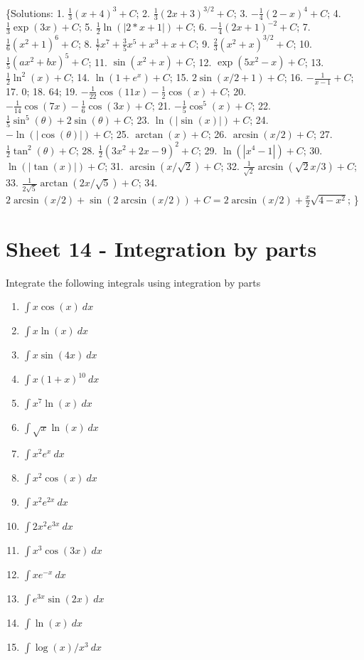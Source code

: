 \documentclass[
  11pt,
  oneside]{book}
\providecommand{\tightlist}{%
  \setlength{\itemsep}{0pt}\setlength{\parskip}{0pt}}
\newcommand{\slide}{}
\theoremstyle{definition}
\theoremstyle{definition}
\theoremstyle{definition}
\theoremstyle{definition}
\theoremstyle{remark}
\begin{document}
\{Solutions:
1. \(\frac{1}{3}(x+4)^3+C\);
2. \(\frac{1}{3}(2x+3)^{3/2}+C\);
3. \(-\frac{1}{4}(2-x)^4 +C\);
4. \(\frac{1}{3}\exp(3x)+C\);
5. \(\frac{1}{2}\ln(|2*x+1|)+C\);
6. \(-\frac{1}{4}(2x+1)^{-2}+C\);
7. \(\frac{1}{6}(x^2+1)^6+C\);
8. \(\frac{1}{7}x^7+\frac{3}{5}x^5+x^3+x+C\);
9. \(\frac{2}{3}(x^2+x)^{3/2}+C\);
10. \(\frac{1}{5}(ax^2+bx)^{5}+C\);
11. \(\sin(x^2+x)+C\);
12. \(\exp(5x^2-x)+C\);
13. \(\frac{1}{2}\ln^2(x)+C\);
14. \(\ln(1+e^x)+C\);
15. \(2\sin(x/2+1)+C\);
16. \(-\frac{1}{x-1}+C\);
17. \(0\);
18. \(64\);
19. \(-\frac{1}{22}\cos(11x)-\frac{1}{2}\cos(x)+C\);
20. \(-\frac{1}{14}\cos(7x)-\frac{1}{6}\cos(3x)+C\);
21. \(-\frac{1}{5}\cos^5(x)+C\);
22. \(\frac{1}{5}\sin^5(\theta)+2\sin(\theta)+C\);
23. \(\ln(|\sin(x)|)+C\);
24. \(-\ln(|\cos(\theta)|)+C\);
25. \(\arctan(x)+C\);
26. \(\arcsin(x/2)+C\);
27. \(\frac{1}{2}\tan^2(\theta)+C\);
28. \(\frac{1}{2}(3x^2+2x-9)^2+C\);
29. \(\ln(|x^4-1|)+C\);
30. \(\ln(|\tan(x)|)+C\);
31. \(\arcsin(x/\sqrt{2})+C\);
32. \(\frac{1}{\sqrt{2}}\arcsin(\sqrt{2}x/3) +C\);
33. \(\frac{1}{2\sqrt{5}}\arctan(2x/\sqrt{5}) +C\);
34. \(2\arcsin(x/2) + \sin\left(2\arcsin(x/2)\right) +C = 2\arcsin(x/2)+\frac{x}{2}\sqrt{4-x^2}\);
\}

\slide

\section{Sheet 14 - Integration by parts}\label{sheet-14---integration-by-parts}

Integrate the following integrals using integration by parts

\begin{enumerate}
\def\labelenumi{\arabic{enumi}.}
\tightlist
\item
  \(\int x\cos(x)\ dx\)
\item
  \(\int x\ln(x)\ dx\)
\item
  \(\int x\sin(4x)\ dx\)
\item
  \(\int x(1+x)^{10}\ dx\)
\item
  \(\int x^7\ln(x)\ dx\)
\item
  \(\int \sqrt{x}\ln(x)\ dx\)
\item
  \(\int x^2e^x\ dx\)
\item
  \(\int x^2\cos(x)\ dx\)
\item
  \(\int x^2e^{2x}\ dx\)
\item
  \(\int 2x^2e^{3x}\ dx\)
\item
  \(\int x^3\cos(3x)\ dx\)
\item
  \(\int xe^{-x}\ dx\)
\item
  \(\int e^{3x}\sin(2x)\ dx\)
\item
  \(\int \ln(x)\ dx\)
\item
  \(\int \log(x)/x^3\ dx\)
\end{enumerate}
\end{document}
